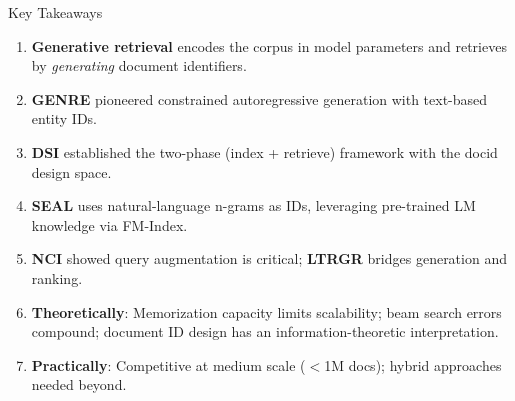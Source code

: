 \documentclass[aspectratio=169,11pt]{beamer}
\begin{document}
\begin{frame}{Key Takeaways}
\begin{enumerate}
    \item \textbf{Generative retrieval} encodes the corpus in model parameters and retrieves by \emph{generating} document identifiers.

    \vspace{0.15cm}
    \item \textbf{GENRE} pioneered constrained autoregressive generation with text-based entity IDs.

    \vspace{0.15cm}
    \item \textbf{DSI} established the two-phase (index + retrieve) framework with the docid design space.

    \vspace{0.15cm}
    \item \textbf{SEAL} uses natural-language n-grams as IDs, leveraging pre-trained LM knowledge via FM-Index.

    \vspace{0.15cm}
    \item \textbf{NCI} showed query augmentation is critical; \textbf{LTRGR} bridges generation and ranking.

    \vspace{0.15cm}
    \item \textbf{Theoretically}: Memorization capacity limits scalability; beam search errors compound; document ID design has an information-theoretic interpretation.

    \vspace{0.15cm}
    \item \textbf{Practically}: Competitive at medium scale ($<$1M docs); hybrid approaches needed beyond.
\end{enumerate}
\end{frame}


\end{document}
